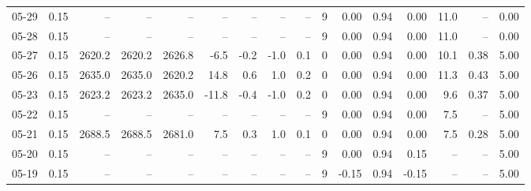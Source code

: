 \begin{threeparttable}
{\begin{tabular}{lrrrrrrrrrrrrrrr}
  05-29 &     0.15 &     -- &     -- &     -- &         -- &             -- &                       -- &                  -- &              9 &       0.00 &      0.94 &           0.00 &             11.0 &              -- &                   0.00 \\
  05-28 &     0.15 &     -- &     -- &     -- &         -- &             -- &                       -- &                  -- &              9 &       0.00 &      0.94 &           0.00 &             11.0 &              -- &                   0.00 \\
  05-27 &     0.15 & 2620.2 & 2620.2 & 2626.8 &       -6.5 &           -0.2 &                     -1.0 &                 0.1 &              0 &       0.00 &      0.94 &           0.00 &             10.1 &            0.38 &                   5.00 \\
  05-26 &     0.15 & 2635.0 & 2635.0 & 2620.2 &       14.8 &            0.6 &                      1.0 &                 0.2 &              0 &       0.00 &      0.94 &           0.00 &             11.3 &            0.43 &                   5.00 \\
  05-23 &     0.15 & 2623.2 & 2623.2 & 2635.0 &      -11.8 &           -0.4 &                     -1.0 &                 0.2 &              0 &       0.00 &      0.94 &           0.00 &              9.6 &            0.37 &                   5.00 \\
  05-22 &     0.15 &     -- &     -- &     -- &         -- &             -- &                       -- &                  -- &              9 &       0.00 &      0.94 &           0.00 &              7.5 &              -- &                   5.00 \\
  05-21 &     0.15 & 2688.5 & 2688.5 & 2681.0 &        7.5 &            0.3 &                      1.0 &                 0.1 &              0 &       0.00 &      0.94 &           0.00 &              7.5 &            0.28 &                   5.00 \\
  05-20 &     0.15 &     -- &     -- &     -- &         -- &             -- &                       -- &                  -- &              9 &       0.00 &      0.94 &           0.15 &               -- &              -- &                   5.00 \\
  05-19 &     0.15 &     -- &     -- &     -- &         -- &             -- &                       -- &                  -- &              9 &      -0.15 &      0.94 &          -0.15 &               -- &              -- &                   5.00 \\

\end{tabular}}
\end{threeparttable}
